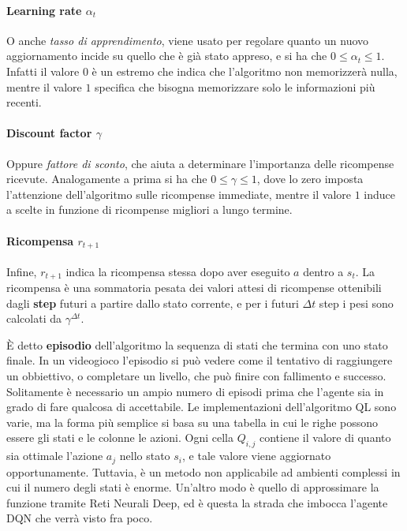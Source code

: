 \documentclass[twoside,twocolumn,10pt]{extarticle}
\theoremstyle{definition}
\begin{document}
		\paragraph*{Learning rate $\alpha_t$} O anche \textit{tasso di apprendimento}, viene usato per regolare quanto un nuovo aggiornamento incide su quello che è già stato appreso, e si ha che $0 \leq \alpha_t \leq 1$. Infatti il valore $0$ è un estremo che indica che l'algoritmo non memorizzerà nulla, mentre il valore $1$ specifica che bisogna memorizzare solo le informazioni più recenti.
		
		\paragraph*{Discount factor $\gamma$} Oppure \textit{fattore di sconto}, che aiuta a determinare l'importanza delle ricompense ricevute. Analogamente a prima si ha che $0 \leq \gamma \leq 1$, dove lo zero imposta l'attenzione dell'algoritmo sulle ricompense immediate, mentre il valore $1$ induce a scelte in funzione di ricompense migliori a lungo termine.
		
		\paragraph*{Ricompensa $r_{t + 1}$}	Infine, $r_{t + 1}$ indica la ricompensa stessa dopo aver eseguito $a$ dentro a $s_t$. La ricompensa è una sommatoria pesata dei valori attesi di ricompense ottenibili dagli \textbf{step} futuri a partire dallo stato corrente, e per i futuri $\Delta t$ step i pesi sono calcolati da $\gamma^{\Delta t}$.
		
		È detto \textbf{episodio} dell'algoritmo la sequenza di stati che termina con uno stato finale. In un videogioco l'episodio si può vedere come il tentativo di raggiungere un obbiettivo, o completare un livello, che può finire con fallimento e successo. Solitamente è necessario un ampio numero di episodi prima che l'agente sia in grado di fare qualcosa di accettabile. Le implementazioni dell'algoritmo QL sono varie, ma la forma più semplice si basa su una tabella in cui le righe possono essere gli stati e le colonne le azioni. Ogni cella $Q_{i, j}$ contiene il valore di quanto sia ottimale l'azione $a_j$ nello stato $s_i$, e tale valore viene aggiornato opportunamente. Tuttavia, è un metodo non applicabile ad ambienti complessi in cui il numero degli stati è enorme. Un'altro modo è quello di approssimare la funzione tramite Reti Neurali Deep, ed è questa la strada che imbocca l'agente DQN che verrà visto fra poco.
		
\end{document}
